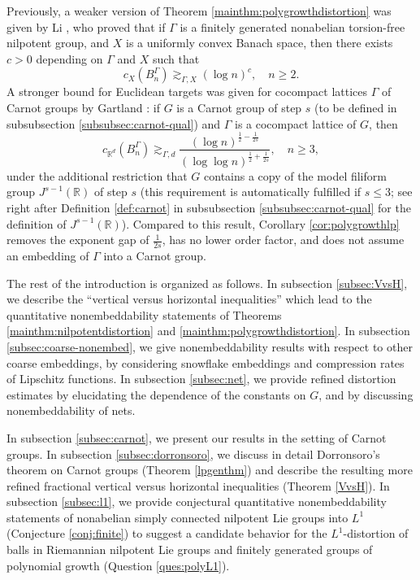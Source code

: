 \documentclass[11pt,reqno]{amsart}
\newcommand{\1}{\mathbf 1}
\begin{document}
Previously, a weaker version of Theorem \ref{mainthm:polygrowthdistortion} was given by Li \cite[Theorem 1.4]{li2014coarse}, who proved that if $\Gamma$ is a finitely generated nonabelian torsion-free nilpotent group, and $X$ is a uniformly convex Banach space, then there exists $c>0$ depending on $\Gamma$ and $X$ such that
\[
c_X\left(B^\Gamma_n\right)\gtrsim_{\Gamma,X}\left(\log n\right)^{c}, \quad n \ge 2.
\]
A stronger bound for Euclidean targets was given for cocompact lattices $\Gamma$ of Carnot groups by Gartland \cite[Corollary 1.6]{gartland2020estimates}: if $G$ is a Carnot group of step $s$ (to be defined in subsubsection \ref{subsubsec:carnot-qual}) and $\Gamma$ is a cocompact lattice of $G$, then
\[
c_{\mathbb{R}^d}\left(B_n^\Gamma\right)\gtrsim_{\Gamma,d} \frac{\left(\log n\right)^{\frac 12-\frac 1{2s}}}{\left(\log\log n\right)^{\frac 12+\frac 1{2s}}},\quad n\ge 3,
\]
under the additional restriction that $G$ contains a copy of the model filiform group $J^{s-1}\left(\mathbb{R}\right)$ of step $s$ (this requirement is automatically fulfilled if $s\le 3$; see right after Definition \ref{def:carnot} in subsubsection \ref{subsubsec:carnot-qual} for the definition of $J^{s-1}\left(\mathbb{R}\right)$). Compared to this result, Corollary \ref{cor:polygrowthlp} removes the exponent gap of $\frac 1{2s}$, has no lower order factor, and does not assume an embedding of $\Gamma$ into a Carnot group.

\bigskip
{} The rest of the introduction is organized as follows. In subsection \ref{subsec:VvsH}, we describe the ``vertical versus horizontal inequalities'' which lead to the quantitative nonembeddability statements of Theorems \ref{mainthm:nilpotentdistortion} and \ref{mainthm:polygrowthdistortion}. In subsection \ref{subsec:coarse-nonembed}, we give nonembeddability results with respect to other coarse embeddings, by considering snowflake embeddings and compression rates of Lipschitz functions. In subsection \ref{subsec:net}, we provide refined distortion estimates by elucidating the dependence of the constants on $G$, and by discussing nonembeddability of nets.

In subsection \ref{subsec:carnot}, we present our results in the setting of Carnot groups. In subsection \ref{subsec:dorronsoro}, we discuss in detail Dorronsoro's theorem on Carnot groups (Theorem \ref{lpgenthm}) and describe the resulting more refined fractional vertical versus horizontal inequalities (Theorem \ref{VvsH}). In subsection \ref{subsec:l1}, we provide conjectural quantitative nonembeddability statements of nonabelian simply connected nilpotent Lie groups into $L^1$ (Conjecture \ref{conj:finite}) to suggest a candidate behavior for the $L^1$-distortion of balls in Riemannian nilpotent Lie groups and finitely generated groups of polynomial growth (Question \ref{ques:polyL1}).
\end{document}
